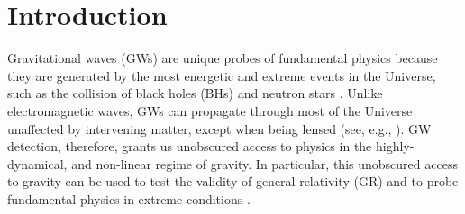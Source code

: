 \documentclass[aps,prx,amsmath,floats,floatfix,twocolumn,
  superscriptaddress,nofootinbib,showpacs]{revtex4-1}
\begin{document}
\maketitle



\section{Introduction}
\label{sec:intro}

Gravitational waves (GWs) are unique probes of fundamental physics because they are generated by the most energetic and extreme events in the Universe, such as the collision of black holes (BHs) and neutron stars \cite{LIGO_01, LIGO_02, LIGO_03, LIGO_04, LIGO_05, LIGO_06, LIGO_07, LIGO_08, LIGO_09, LIGO_10, LIGO_11, LIGO_GW190412, LIGO_GW190814}.
Unlike electromagnetic waves, GWs can propagate through most of the Universe unaffected by intervening matter, except when being lensed (see, e.g., \cite{Takahashi:2003ix}). 
GW detection, therefore, grants us unobscured access to physics in the highly-dynamical, and non-linear regime of gravity. In particular, this unobscured access to gravity can be used to test the validity of general relativity (GR) and to probe fundamental physics in extreme conditions \cite{LIGO_07, LIGO_11, LIGOScientific:2021sio, Perkins:2022fhr, Yunes:2013dva}. 
\end{document}
